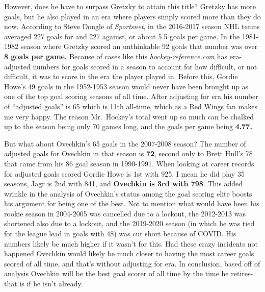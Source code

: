 \documentclass[
]{article}
\begin{document}
However, does he have to surpass Gretzky to attain this title? Gretzky
has more goals, but he also played in an era where players simply scored
more than they do now. According to Steve Dongle of \emph{Sportsnet}, in
the 2016-2017 season NHL teams averaged 227 goals for and 227 against,
or about 5.5 goals per game. In the 1981-1982 season where Gretzky
scored an unthinkable 92 goals that number was over \textbf{8 goals per
game.} Because of cases like this \emph{hockey-reference.com} has
era-adjusted numbers for goals scored in a season to account for how
difficult, or not difficult, it was to score in the era the player
played in. Before this, Gordie Howe's 49 goals in the 1952-1953 season
would never have been brought up as one of the top goal scoring seasons
of all time. After adjusting for era his number of ``adjusted goals'' is
65 which is 11th all-time, which as a Red Wings fan makes me very happy.
The reason Mr.~Hockey's total went up so much can be chalked up to the
season being only 70 games long, and the goals per game being
\textbf{4.77.}

But what about Ovechkin's 65 goals in the 2007-2008 season? The number
of adjusted goals for Ovechkin in that season is \textbf{72}, second
only to Brett Hull's 78 that came from his 86 goal season in 1990-1991.
When looking at career records for adjusted goals scored Gordie Howe is
1st with 925, I mean he did play 35 seasons, Jagr is 2nd with 841, and
\textbf{Ovechkin is 3rd with 798}. This added wrinkle in the analysis of
Ovechkin's status among the goal scoring elite boosts his argument for
being one of the best. Not to mention what would have been his rookie
season in 2004-2005 was cancelled due to a lockout, the 2012-2013 was
shortened also due to a lockout, and the 2019-2020 season (in which he
was tied for the league lead in goals with 48) was cut short because of
COVID. His numbers likely be much higher if it wasn't for this. Had
these crazy incidents not happened Ovechkin would likely be much closer
to having the most career goals scored of all time, and that's without
adjusting for era. In conclusion, based off of analysis Ovechkin will be
the best goal scorer of all time by the time he retires- that is if he
isn't already.
\end{document}
